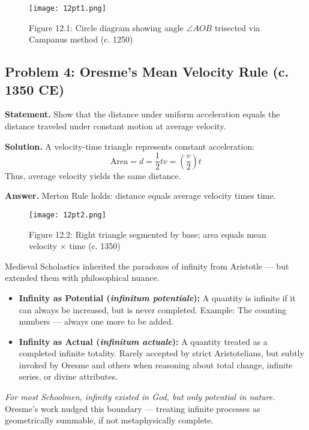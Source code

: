 \documentclass[9pt]{article}
\begin{document}
\begin{figure}[H]
\centering
\texttt{[image: 12pt1.png]}
\caption{Figure 12.1: Circle diagram showing angle \( \angle AOB \) trisected via Campanus method (c. 1250)}
\end{figure}

\newpage

\subsection*{Problem 4: Oresme’s Mean Velocity Rule (c. 1350 CE)}

\textbf{Statement.} Show that the distance under uniform acceleration equals the distance traveled under constant motion at average velocity.

\textbf{Solution.} A velocity-time triangle represents constant acceleration:
\[
\text{Area} = d = \frac{1}{2}tv = \left( \frac{v}{2} \right)t
\]
Thus, average velocity yields the same distance.

\textbf{Answer.} Merton Rule holds: distance equals average velocity times time.

\begin{figure}[H]
\centering
\texttt{[image: 12pt2.png]}
\caption{Figure 12.2: Right triangle segmented by base; area equals mean velocity × time (c. 1350)}
\end{figure}

\begin{tcolorbox}[colback=gray!5!white,colframe=black!75!white,title=Scholastic Note: Infinity as Potential and Actual]

Medieval Scholastics inherited the paradoxes of infinity from Aristotle — but extended them with philosophical nuance.

\begin{itemize}
    \item \textbf{Infinity as Potential (\textit{infinitum potentiale}):}  
    A quantity is infinite if it can always be increased, but is never completed.  
    Example: The counting numbers — always one more to be added.

    \item \textbf{Infinity as Actual (\textit{infinitum actuale}):}  
    A quantity treated as a completed infinite totality.  
    Rarely accepted by strict Aristotelians, but subtly invoked by Oresme and others when reasoning about total change, infinite series, or divine attributes.
\end{itemize}

\textit{For most Schoolmen, infinity existed in God, but only potential in nature.}  
Oresme’s work nudged this boundary — treating infinite processes as geometrically summable, if not metaphysically complete.

\end{tcolorbox}
\end{document}
